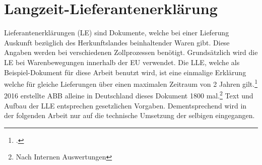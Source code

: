 \FloatBarrier
\section{Langzeit-Lieferantenerklärung}

 Lieferantenerklärungen (LE) sind Dokumente, welche bei einer Lieferung Auskunft bezüglich des Herkunftslandes beinhaltender Waren gibt. Diese Angaben werden bei verschiedenen Zollprozessen benötigt. Grundsätzlich wird die \ac{LE} bei Warenbewegungen innerhalb der \ac{EU} verwendet. Die \ac{LLE}, welche als Beispiel-Dokument für diese Arbeit benutzt wird, ist eine einmalige Erklärung welche für gleiche Lieferungen über einen maximalen Zeitraum von 2 Jahren gilt.\footcite{ZOLL.2017} 2016 erstellte ABB alleine in Deutschland dieses Dokument 1800 mal.\footnote{Nach Internen Auswertungen} Text und Aufbau der \ac{LLE} entsprechen gesetzlichen Vorgaben. Dementsprechend wird in der folgenden Arbeit nur auf die technische Umsetzung der selbigen eingegangen.
